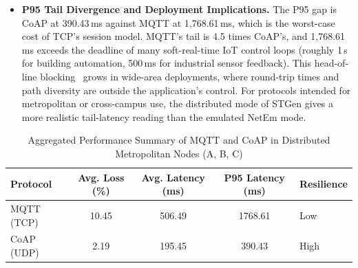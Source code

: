 \documentclass[jsan,article,submit,moreauthors,pdftex]{Definitions/mdpi}
\begin{document}
\begin{itemize}
    \item \textbf{P95 Tail Divergence and Deployment Implications.}
    The P95 gap is CoAP at 390.43\,ms against MQTT at 1{,}768.61\,ms, which is the worst-case cost of TCP's session model. MQTT's tail is 4.5 times CoAP's, and 1{,}768.61\,ms exceeds the deadline of many soft-real-time {IoT} control loops (roughly 1\,s for building automation, 500\,ms for industrial sensor feedback). This head-of-line blocking~\cite{mckeown1999high} grows in wide-area deployments, where round-trip times and path diversity are outside the application's control. For protocols intended for metropolitan or cross-campus use, the distributed mode of STGen gives a more realistic tail-latency reading than the emulated NetEm mode.
\end{itemize}


\begin{table}[!t]
\centering
\caption{Aggregated Performance Summary of MQTT and CoAP in Distributed Metropolitan Nodes (A, B, C)}
\label{tab:aggregated_distributed}
\begin{tabular}{l c c c l}
\toprule
\textbf{Protocol} & \textbf{Avg. Loss (\%)} & \textbf{Avg. Latency (ms)} & \textbf{P95 Latency (ms)} & \textbf{Resilience} \\
\midrule
MQTT (TCP) & 10.45 & 506.49 & 1768.61 & Low \\
CoAP (UDP) & 2.19 & 195.45 & 390.43 & High \\
\bottomrule
\end{tabular}
\end{table}
\end{document}
